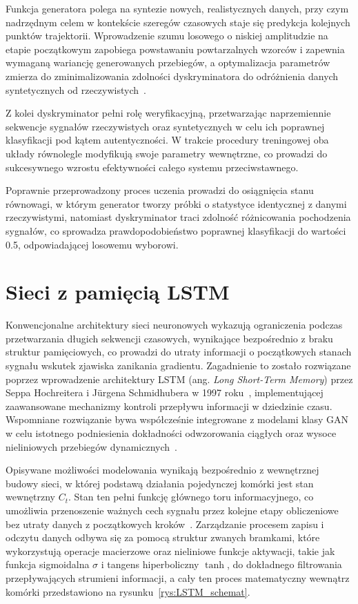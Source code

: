 Funkcja generatora polega na syntezie nowych, realistycznych danych, przy czym nadrzędnym celem w kontekście szeregów czasowych staje się predykcja kolejnych punktów trajektorii. Wprowadzenie szumu losowego o niskiej amplitudzie na etapie początkowym zapobiega powstawaniu powtarzalnych wzorców i zapewnia wymaganą wariancję generowanych przebiegów, a optymalizacja parametrów zmierza do zminimalizowania zdolności dyskryminatora do odróżnienia danych syntetycznych od rzeczywistych~\cite{goodfellow2016, GAN}.
 
Z kolei dyskryminator pełni rolę weryfikacyjną, przetwarzając naprzemiennie sekwencje sygnałów rzeczywistych oraz syntetycznych w celu ich poprawnej klasyfikacji pod kątem autentyczności. W trakcie procedury treningowej oba układy równolegle modyfikują swoje parametry wewnętrzne, co prowadzi do sukcesywnego wzrostu efektywności całego systemu przeciwstawnego.
 
Poprawnie przeprowadzony proces uczenia prowadzi do osiągnięcia stanu równowagi, w którym generator tworzy próbki o statystyce identycznej z danymi rzeczywistymi, natomiast dyskryminator traci zdolność różnicowania pochodzenia sygnałów, co sprowadza prawdopodobieństwo poprawnej klasyfikacji do wartości 0.5, odpowiadającej losowemu wyborowi.
 
\section{Sieci z pamięcią LSTM}
 
Konwencjonalne architektury sieci neuronowych wykazują ograniczenia podczas przetwarzania długich sekwencji czasowych, wynikające bezpośrednio z braku struktur pamięciowych, co prowadzi do utraty informacji o początkowych stanach sygnału wskutek zjawiska zanikania gradientu. Zagadnienie to zostało rozwiązane poprzez wprowadzenie architektury LSTM (ang. \textit{Long Short-Term Memory}) przez Seppa Hochreitera i Jürgena Schmidhubera w 1997 roku~\cite{hochreiter1997long}, implementującej zaawansowane mechanizmy kontroli przepływu informacji w dziedzinie czasu. Wspomniane rozwiązanie bywa współcześnie integrowane z modelami klasy GAN w celu istotnego podniesienia dokładności odwzorowania ciągłych oraz wysoce nieliniowych przebiegów dynamicznych~\cite{GANLSTM1, GANLSTM2, GANLSTM3}.
 
Opisywane możliwości modelowania wynikają bezpośrednio z wewnętrznej budowy sieci, w której podstawą działania pojedynczej komórki jest stan wewnętrzny $C_t$. Stan ten pełni funkcję głównego toru informacyjnego, co umożliwia przenoszenie ważnych cech sygnału przez kolejne etapy obliczeniowe bez utraty danych z początkowych kroków~\cite{LSTM1}. Zarządzanie procesem zapisu i odczytu danych odbywa się za pomocą struktur zwanych bramkami, które wykorzystują operacje macierzowe oraz nieliniowe funkcje aktywacji, takie jak funkcja sigmoidalna $\sigma$ i tangens hiperboliczny $\tanh$, do dokładnego filtrowania przepływających strumieni informacji, a cały ten proces matematyczny wewnątrz komórki przedstawiono na rysunku~\ref{rys:LSTM_schemat}.

